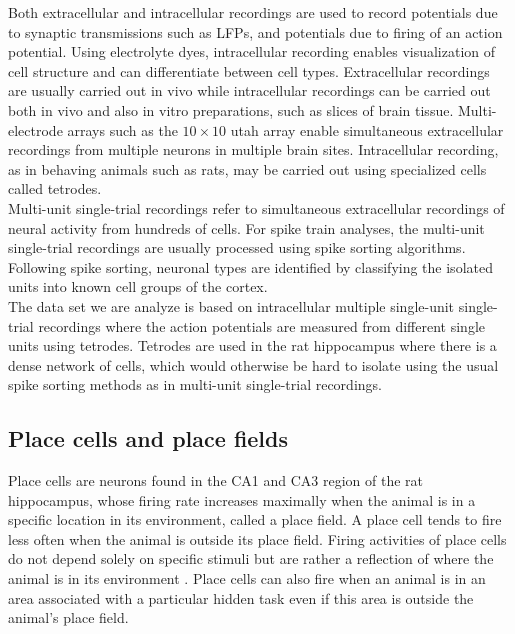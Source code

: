 Both extracellular and intracellular recordings are used to record potentials due to synaptic transmissions such as LFPs, and potentials due to firing of an action potential. Using electrolyte dyes, intracellular recording enables visualization
of cell structure and can differentiate between cell types.
Extracellular recordings are usually carried out in vivo while intracellular recordings can be carried out both in vivo and also in vitro preparations, such as slices of brain tissue. Multi-electrode arrays such as the $10 \times 10$ utah array enable simultaneous extracellular recordings from  multiple neurons in multiple brain sites. Intracellular recording, as in behaving animals such as rats, may be carried out using specialized cells called tetrodes.\\
Multi-unit single-trial recordings refer to simultaneous  extracellular recordings of neural activity from hundreds of cells.
For spike train analyses, the multi-unit single-trial recordings are usually processed using  spike sorting algorithms. Following spike sorting, neuronal types are identified by classifying the isolated units into known cell groups of the cortex.\\

The data set we are analyze is based on intracellular multiple single-unit single-trial recordings where the action potentials are measured from different single units using tetrodes. Tetrodes are used in the rat hippocampus where there is a dense network of cells, which would otherwise be hard to isolate using the usual spike sorting methods as in multi-unit single-trial recordings.


\subsection{Place cells and place fields}
Place cells are neurons found in the CA1 and CA3 region of the rat hippocampus,
whose firing rate increases maximally when the animal is in a specific location
in its environment, called a place field. A place cell tends to fire less often when the animal is outside its place field. Firing activities of place cells do not depend solely on specific stimuli but are rather a reflection of where the animal is in its environment \cite{OKeefe1971}. Place cells can also fire when an animal is in an area associated with a particular hidden task even if this area
is outside the animal's place field.


